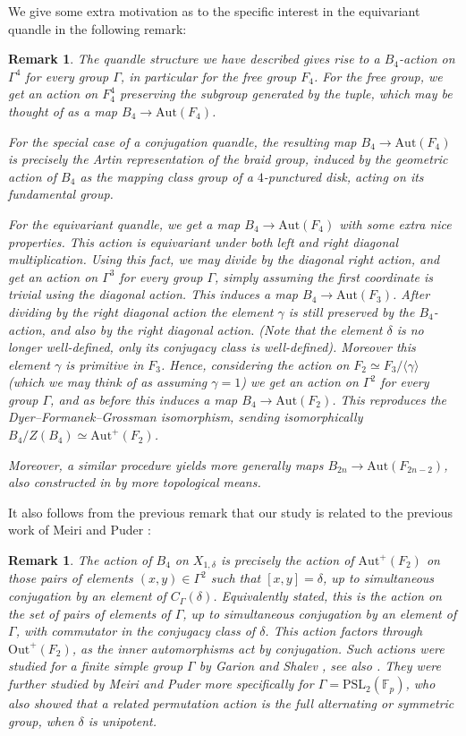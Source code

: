\documentclass[letterpaper]{amsart}
\newtheorem{remark}[theorem]{Remark}
\begin{document}
We give some extra motivation as to the specific interest in the equivariant quandle in the following remark:
\begin{remark}
    The quandle structure we have described gives rise to a $B_4$-action on $\Gamma^4$ for every group $\Gamma$, in particular for the free group $F_4$. For the free group, we get an action on $F_4^4$ preserving the subgroup generated by the tuple, which may be thought of as a map $B_4 \to \mathrm{Aut}(F_4)$.
    
   For the special case of a conjugation quandle, the resulting map $B_4 \to \mathrm{Aut}(F_4)$ is precisely the Artin representation of the braid group, induced by the geometric action of $B_4$ as the mapping class group of a $4$-punctured disk, acting on its fundamental group.
    
    For the equivariant quandle, we get a map $B_4 \to \mathrm{Aut}(F_4)$ with some extra nice properties. This action is equivariant under both left and right diagonal multiplication. Using this fact, we may divide by the diagonal right action, and get an action on $\Gamma^3$ for every group $\Gamma$, simply assuming the first coordinate is trivial using the diagonal action. This induces a map $B_4 \to \mathrm{Aut}(F_3)$. After dividing by the right diagonal action the element $\gamma$ is still preserved by the $B_4$-action, and also by the right diagonal action. (Note that the element $\delta$ is no longer well-defined, only its conjugacy class is well-defined). Moreover this element $\gamma$ is primitive in $F_3$. Hence, considering the action on $F_2 \simeq F_3/\langle\gamma\rangle$ (which we may think of as assuming $\gamma=1$) we get an action on $\Gamma^2$ for every group $\Gamma$, and as before this induces a map $B_4 \to \mathrm{Aut}(F_2)$. This reproduces the Dyer--Formanek--Grossman isomorphism, sending isomorphically $B_4 / Z(B_4) \simeq \mathrm{Aut}^{+}(F_2)$.
    
    Moreover, a similar procedure yields  more generally maps $B_{2n} \to \mathrm{Aut}(F_{2n-2})$, also constructed in \cite{kassel2013action} by more topological means.
\end{remark}
It also follows from the previous remark that our study is related to the previous work of Meiri and Puder \cite{meiri2018markoff}:
\begin{remark}
    The action of $B_4$ on $X_{1,\delta}$ is precisely the action of $\mathrm{Aut}^+(F_2)$ on those pairs of elements $(x,y) \in \Gamma^2$ such that $[x,y]=\delta$, up to simultaneous conjugation by an element of $C_\Gamma(\delta)$. Equivalently stated, this is the action on the set of pairs of elements of $\Gamma$, up to simultaneous conjugation by an element of $\Gamma$, with commutator in the conjugacy class of $\delta$. This action factors through $\mathrm{Out}^+(F_2)$, as the inner automorphisms act by conjugation. Such actions were studied for a finite simple group $\Gamma$ by Garion and Shalev \cite{garion2009commutator}, see also \cite{lubotzky2011dynamics}. They were further studied by Meiri and Puder \cite{meiri2018markoff} more specifically for $\Gamma = \mathrm{PSL}_2(\mathbb{F}_p)$, who also showed that a related permutation action is the full alternating or symmetric group, when $\delta$ is unipotent.
\end{remark}
\end{document}
